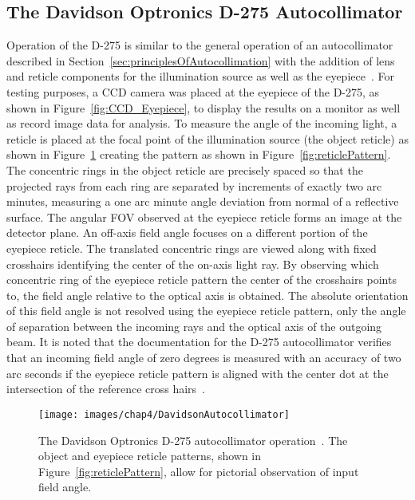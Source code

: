 \subsection{The Davidson Optronics D-275 Autocollimator}
Operation of the D-275 is similar to the general operation of an autocollimator described in Section~\ref{sec:principlesOfAutocollimation} with the addition of lens and reticle components for the illumination source as well as the eyepiece~\cite{DavidsonOptronics}. For testing purposes, a \ac{CCD} camera was placed at the eyepiece of the D-275, as shown in Figure~\ref{fig:CCD_Eyepiece}, to display the results on a monitor as well as record image data for analysis. To measure the angle of the incoming light, a reticle is placed at the focal point of the illumination source (the object reticle) as shown in Figure~\ref{fig:DavidsonAutocollimator} creating the pattern as shown in Figure~\ref{fig:reticlePattern}. The concentric rings in the object reticle are precisely spaced so that the projected rays from each ring are separated by increments of exactly two arc minutes, measuring a one arc minute angle deviation from normal of a reflective surface. The angular \acf{FOV} observed at the eyepiece reticle  forms an image at the detector plane. An off-axis field angle focuses on a different portion of the eyepiece reticle. The translated concentric rings are viewed along with fixed crosshairs identifying the center of the on-axis light ray. By observing which concentric ring of the eyepiece reticle pattern the center of the crosshairs points to, the field angle relative to the optical axis is obtained. The absolute orientation of this field angle is not resolved using the eyepiece reticle pattern, only the angle of separation between the incoming rays and the optical axis of the outgoing beam. It is noted that the documentation for the D-275 autocollimator verifies that an incoming field angle of zero degrees is measured with an accuracy of two arc seconds if the eyepiece reticle pattern is aligned with the center dot at the intersection of the reference cross hairs~\cite{D275}.

\begin{figure}[H]  %
\centering
\texttt{[image: images/chap4/DavidsonAutocollimator]}
\caption{The Davidson Optronics D-275 autocollimator operation~\cite{DavidsonOptronics}. The object and eyepiece reticle patterns, shown in Figure~\ref{fig:reticlePattern}, allow for pictorial observation of input field angle.}
\label{fig:DavidsonAutocollimator}
\end{figure}

